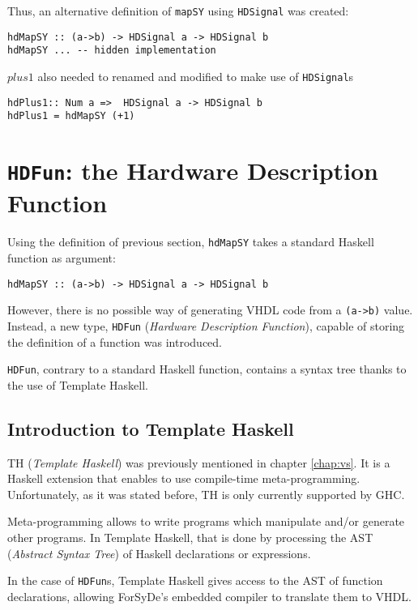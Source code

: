 Thus, an alternative definition of \texttt{mapSY} using
\texttt{HDSignal} was created:

\begin{lstlisting}
hdMapSY :: (a->b) -> HDSignal a -> HDSignal b
hdMapSY ... -- hidden implementation
\end{lstlisting}

$\mathit{plus1}$ also needed to renamed and modified to make use of
\texttt{HDSignal}s

\begin{lstlisting}
hdPlus1:: Num a =>  HDSignal a -> HDSignal b
hdPlus1 = hdMapSY (+1) 
\end{lstlisting}


\section{\texttt{HDFun}: the Hardware Description Function}
\label{sec:hdfun}

Using the definition of previous section, \texttt{hdMapSY} takes a
standard Haskell function as argument:

\begin{lstlisting}
hdMapSY :: (a->b) -> HDSignal a -> HDSignal b
\end{lstlisting}

However, there is no possible way of generating VHDL code from a
\texttt{(a->b)} value. Instead, a new type, \texttt{HDFun}
(\textit{Hardware Description Function}), capable of storing the
definition of a function was introduced.

\texttt{HDFun}, contrary to a standard Haskell function, contains a
syntax tree thanks to the use of Template Haskell.


\subsection{Introduction to Template Haskell}
TH \cite{metahaskell} (\textit{Template Haskell}) was previously
mentioned in chapter \ref{chap:vs}. It is a Haskell extension that
enables to use compile-time meta-programming. Unfortunately, as it was
stated before, TH is only currently supported by GHC.

Meta-programming allows to write programs which manipulate and/or
generate other programs. In Template Haskell, that is done by
processing the AST (\textit{Abstract Syntax Tree}) of Haskell
declarations or expressions.

In the case of \texttt{HDFun}s, Template Haskell gives access to the
AST of function declarations, allowing ForSyDe's embedded compiler to
translate them to VHDL.

